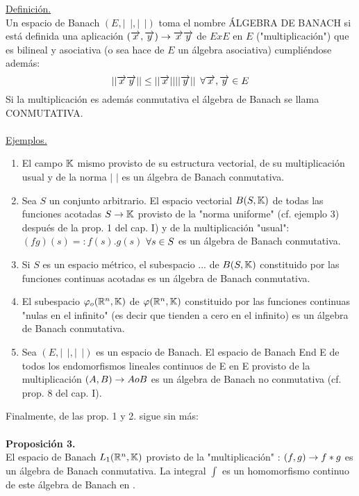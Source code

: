 \underline{Definición.}   \\
Un espacio de Banach $(E,| \phantom{s}|,| \phantom{s}|)$ toma el nombre ÁLGEBRA DE BANACH si está definida una aplicación $(\overrightarrow{x},\overrightarrow{y}) \rightarrow \overrightarrow{x} \overrightarrow{y}$ de $ExE$ en $E$ ("multiplicación") que es bilineal y asociativa (o sea hace de $E$ un álgebra asociativa) cumpliéndose además:
$$
|| \overrightarrow{x} \overrightarrow{y} || \leq || \overrightarrow{x} || ||\overrightarrow{y} || \phantom{s} \forall \overrightarrow{x}, \overrightarrow{y} \in E
$$
Si la multiplicación es además conmutativa el álgebra de Banach se llama CONMUTATIVA. \\ \\
\underline{Ejemplos.}
\begin{enumerate}[1)]
\item El campo $\mathbb{K}$ mismo provisto de su estructura vectorial, de su multiplicación usual y de la norma $|$ $|$ es un álgebra de Banach conmutativa. 

\item Sea $S$ un conjunto arbitrario. El espacio vectorial $B(S,\mathbb{K})$ de todas las funciones acotadas $S \rightarrow \mathbb{K}$ provisto de la "norma uniforme" (cf. ejemplo 3) después de la prop. 1 del cap. I) y de la multiplicación "usual": $(fg)(s)=:f(s).g(s)$ $\forall s \in S$ es un álgebra de Banach conmutativa.

\item Si $S$ es un espacio métrico, el subespacio ... de $B(S,\mathbb{K})$ constituido por las funciones continuas acotadas es un álgebra de Banach conmutativa. 

\item El subespacio $\varphi_o (\mathbb{R}^n , \mathbb{K})$ de $\varphi (\mathbb{R}^n, \mathbb{K})$ constituido por las funciones continuas "nulas en el infinito" (es decir que tienden a cero en el infinito) es un álgebra de Banach conmutativa.

\item Sea $(E,| \phantom{s} |,| \phantom{s}|)$ es un espacio de Banach. El espacio de Banach End E de todos los endomorfismos lineales continuos de E en E provisto de la multiplicación $(A,B) \rightarrow A o B$ es un álgebra de Banach no conmutativa (cf. prop. 8 del cap. I).\\

\end{enumerate}
  
  Finalmente, de las prop. 1 y 2. sigue sin más: \\ \\
  
  \textbf{Proposición 3.} \\
El espacio de Banach $L_1 (\mathbb{R}^n, \mathbb{K})$ provisto de la "multiplicación" : $(f,g) \rightarrow f*g$ es un álgebra de Banach conmutativa. La integral $\int$ es un homomorfismo continuo de este álgebra de Banach en \K. \\
